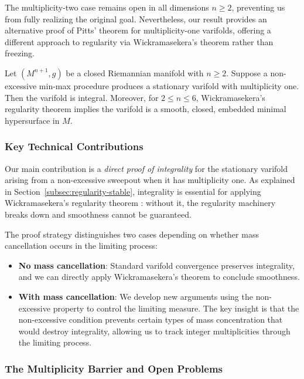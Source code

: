 The multiplicity-two case remains open in all dimensions $n \geq 2$, preventing us from fully
realizing the original goal. Nevertheless, our result provides an alternative proof of Pitts'
theorem for multiplicity-one varifolds, offering a different approach to regularity via
Wickramasekera's theorem rather than freezing.

\begin{theorem}\label{thm:non-excessive}
    Let $(M^{n+1}, g)$ be a closed Riemannian manifold with $n \geq 2$. Suppose a non-excessive
    min-max procedure produces a stationary varifold with multiplicity one. Then the varifold is
    integral. Moreover, for $2 \leq n \leq 6$, Wickramasekera's regularity theorem implies the
    varifold is a smooth, closed, embedded minimal hypersurface in $M$.
\end{theorem}

\subsubsection{Key Technical Contributions}

Our main contribution is a \emph{direct proof of integrality} for the stationary varifold arising
from a non-excessive sweepout when it has multiplicity one. As explained in
Section~\ref{subsec:regularity-stable}, integrality is essential for applying Wickramasekera's
regularity theorem \cite{Wic14}: without it, the regularity machinery breaks down and smoothness
cannot be guaranteed.

The proof strategy distinguishes two cases depending on whether mass cancellation occurs in the
limiting process:
\begin{itemize}
    \item \textbf{No mass cancellation}: Standard varifold convergence preserves integrality, and
    we can directly apply Wickramasekera's theorem to conclude smoothness.

    \item \textbf{With mass cancellation}: We develop new arguments using the non-excessive property
    to control the limiting measure. The key insight is that the non-excessive condition prevents
    certain types of mass concentration that would destroy integrality, allowing us to track integer
    multiplicities through the limiting process.
\end{itemize}

\subsubsection{The Multiplicity Barrier and Open Problems}

